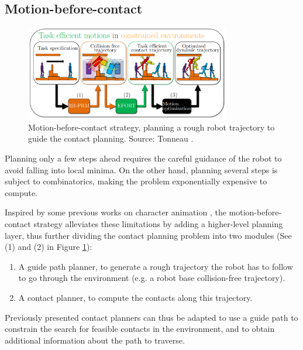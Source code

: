 \subsection{Motion-before-contact\label{subsub:motion_before_contact}}
\begin{figure}[h]
    \centering
    \includegraphics[width=0.8\textwidth]{Figures/Chapter_SOTA//diagram_steve_thesis.png}
    \caption{Motion-before-contact strategy, planning a rough robot trajectory to guide the contact planning. Source: Tonneau \cite{thesis_steve}.}
    \label{fig:cp_mbc}
\end{figure}

Planning only a few steps ahead requires the careful guidance of the robot to avoid falling into local minima.
On the other hand, planning several steps is subject to combinatorics, making the problem exponentially expensive to compute.

Inspired by some previous works on character animation \cite{thesis_kuffner_1999, pettre_2_stages_2003}, the motion-before-contact strategy alleviates these limitations by adding a higher-level planning layer, thus further dividing the contact planning problem into two modules (See (1) and (2) in Figure \ref{fig:cp_mbc}):
\begin{enumerate}
    \item A guide path planner, to generate a rough trajectory the robot has to follow to go through the environment (e.g. a robot base collision-free trajectory).
    \item A contact planner, to compute the contacts along this trajectory.
\end{enumerate}
Previously presented contact planners can thus be adapted to use a guide path to constrain the search for feasible contacts in the environment, and to obtain additional information about the path to traverse.


